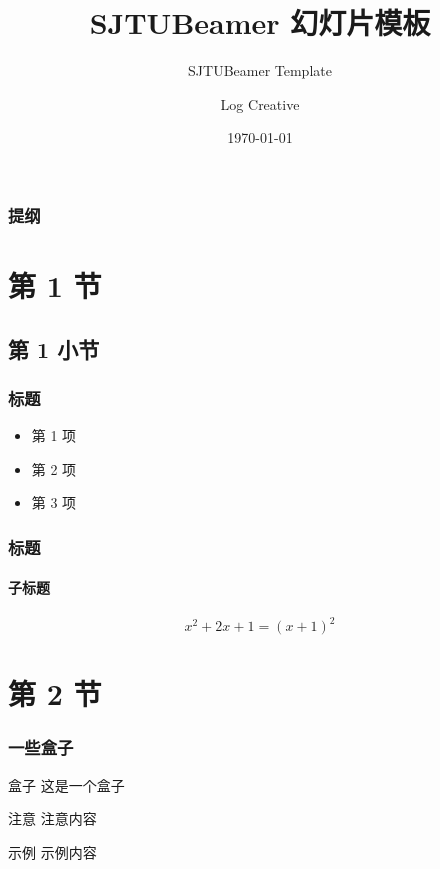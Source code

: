 \documentclass{beamer}
\title{\textsf{SJTUBeamer} 幻灯片模板}  %
\subtitle{SJTUBeamer Template}         %
\author{Log Creative}                  %
\institute[]{github.com/LogCreative}   %
\date{\today}                          %
\begin{document}
    \sjtutitle                         %

    \begin{frame}
        \frametitle{提纲}
        \tableofcontents               %
    \end{frame}

    \section{第 1 节}
    \subsection{第 1 小节}
    \begin{frame}
        \frametitle{标题}

        \begin{itemize}
            \item 第 1 项
            \item 第 2 项
            \item 第 3 项
        \end{itemize}

    \end{frame}

    \begin{frame}
        \frametitle{标题}
        \framesubtitle{子标题}

        \begin{equation}
            x^2+2x+1=(x+1)^2
        \end{equation}
        
    \end{frame}

    \section{第 2 节}
    \begin{frame}
        \frametitle{一些盒子}
        
        \begin{block}{盒子}
            这是一个盒子
        \end{block}

        \begin{alertblock}{注意}
            注意内容
        \end{alertblock}

        \begin{exampleblock}{示例}
            示例内容
        \end{exampleblock}
    \end{frame}
\end{document}
